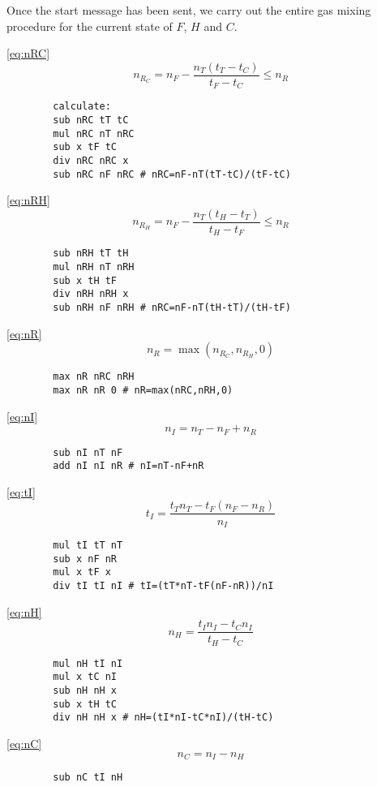 \documentclass{article}
\begin{document}
Once the start message has been sent, we carry out the entire
gas mixing procedure for the current state of $F$, $H$ and $C$.
\vspace{1em}
\begin{paracol}{2}
    \noindent
    \autoref{eq:nRC}
    \[
        n_{R_C} = n_F-\frac{n_T(t_T-t_C)}{t_F-t_C} \le n_R
    \]
    \switchcolumn
    \vspace{-1em}
    \begin{verbatim}
        calculate:
        sub nRC tT tC
        mul nRC nT nRC
        sub x tF tC
        div nRC nRC x
        sub nRC nF nRC # nRC=nF-nT(tT-tC)/(tF-tC)
    \end{verbatim}
    \switchcolumn*
    \noindent
    \autoref{eq:nRH}
    \[
        n_{R_H} = n_F-\frac{n_T(t_H-t_T)}{t_H-t_F} \le n_R
    \]
    \switchcolumn
    \vspace{-1em}
    \begin{verbatim}
        sub nRH tT tH
        mul nRH nT nRH
        sub x tH tF
        div nRH nRH x
        sub nRH nF nRH # nRC=nF-nT(tH-tT)/(tH-tF)
    \end{verbatim}
    \switchcolumn*
    \noindent
    \autoref{eq:nR}
    \[
        n_R = \max(n_{R_C},n_{R_H},0)
    \]
    \switchcolumn
    \vspace{-1em}
    \begin{verbatim}
        max nR nRC nRH
        max nR nR 0 # nR=max(nRC,nRH,0)
    \end{verbatim}
    \switchcolumn*
    \noindent
    \autoref{eq:nI}
    \[
        n_I = n_T-n_F+n_R
    \]
    \switchcolumn
    \vspace{-1em}
    \begin{verbatim}
        sub nI nT nF
        add nI nI nR # nI=nT-nF+nR
    \end{verbatim}
    \switchcolumn*
    \noindent
    \autoref{eq:tI}
    \[
        t_I = \frac{t_T n_T-t_F(n_F-n_R)}{n_I}
    \]
    \switchcolumn
    \vspace{-1em}
    \begin{verbatim}
        mul tI tT nT
        sub x nF nR
        mul x tF x
        div tI tI nI # tI=(tT*nT-tF(nF-nR))/nI
    \end{verbatim}
    \switchcolumn*
    \noindent
    \autoref{eq:nH}
    \[
        n_H = \frac{t_I n_I-t_C n_I}{t_H-t_C}
    \]
    \switchcolumn
    \vspace{-1em}
    \begin{verbatim}
        mul nH tI nI
        mul x tC nI
        sub nH nH x
        sub x tH tC
        div nH nH x # nH=(tI*nI-tC*nI)/(tH-tC)
    \end{verbatim}
    \switchcolumn*
    \noindent
    \autoref{eq:nC}
    \[
        n_C = n_I-n_H
    \]
    \switchcolumn
    \vspace{-1em}
    \begin{verbatim}
        sub nC tI nH
    \end{verbatim}
\end{paracol}
\end{document}
